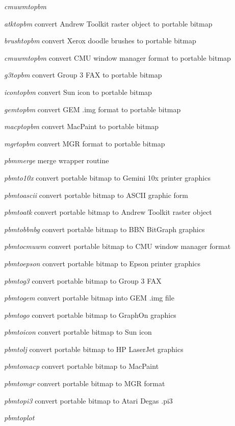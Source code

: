 \begin{TPlist}{{\it cmuwmtopbm}}
\item[{{\it atktopbm}}]
convert Andrew Toolkit raster object to portable bitmap
\item[{{\it brushtopbm}}]
convert Xerox doodle brushes to portable bitmap
\item[{{\it cmuwmtopbm}}]
convert CMU window manager format to portable bitmap
\item[{{\it g3topbm}}]
convert Group 3 FAX to portable bitmap
\item[{{\it icontopbm}}]
convert Sun icon to portable bitmap
\item[{{\it gemtopbm}}]
convert GEM .img format to portable bitmap
\item[{{\it macptopbm}}]
convert MacPaint to portable bitmap
\item[{{\it mgrtopbm}}]
convert MGR format to portable bitmap
\item[{{\it pbmmerge}}]
merge wrapper routine
\item[{{\it pbmto10x}}]
convert portable bitmap to Gemini 10x printer graphics
\item[{{\it pbmtoascii}}]
convert portable bitmap to ASCII graphic form
\item[{{\it pbmtoatk}}]
convert portable bitmap to Andrew Toolkit raster object
\item[{{\it pbmtobbnbg}}]
convert portable bitmap to BBN BitGraph graphics
\item[{{\it pbmtocmuwm}}]
convert portable bitmap to CMU window manager format
\item[{{\it pbmtoepson}}]
convert portable bitmap to Epson printer graphics
\item[{{\it pbmtog3}}]
convert portable bitmap to Group 3 FAX
\item[{{\it pbmtogem}}]
convert portable bitmap into GEM .img file
\item[{{\it pbmtogo}}]
convert portable bitmap to GraphOn graphics
\item[{{\it pbmtoicon}}]
convert portable bitmap to Sun icon
\item[{{\it pbmtolj}}]
convert portable bitmap to HP LaserJet graphics
\item[{{\it pbmtomacp}}]
convert portable bitmap to MacPaint
\item[{{\it pbmtomgr}}]
convert portable bitmap to MGR format
\item[{{\it pbmtopi3}}]
convert portable bitmap to Atari Degas .pi3
\item[{{\it pbmtoplot}}]

\end{TPlist}
